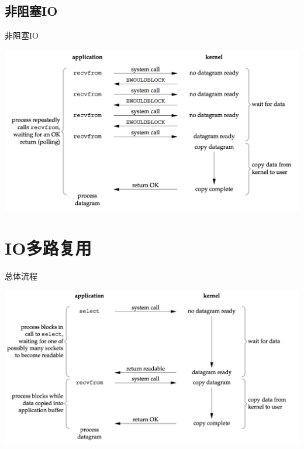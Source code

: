 \documentclass[UTF8]{beamer}
\begin{document}
\subsection{非阻塞IO}
\begin{frame}{非阻塞IO}
  \centerline{\includegraphics[width=\textwidth]{img/non-block.png}}
\end{frame}
\section{IO多路复用}
\begin{frame}{总体流程}
  \centerline{\includegraphics[width=\textwidth]{img/multi-io.png}}
\end{frame}
\end{document}

